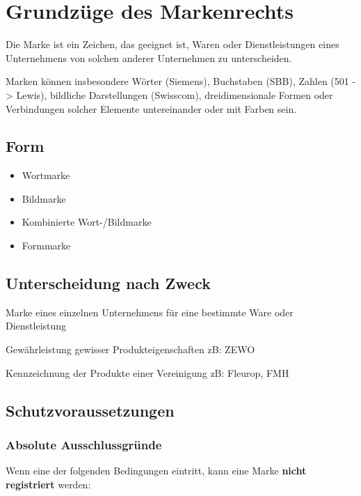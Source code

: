 \section{Grundzüge des Markenrechts}

Die Marke ist ein Zeichen, das geeignet ist, Waren oder Dienstleistungen
eines Unternehmens von solchen anderer Unternehmen zu unterscheiden.

Marken können insbesondere Wörter (Siemens), Buchstaben (SBB), Zahlen
(501 -> Lewis), bildliche Darstellungen (Swisscom),
dreidimensionale Formen oder Verbindungen solcher Elemente untereinander
oder mit Farben sein.

\subsection{Form}

\begin{itemize}
\tightlist
\item Wortmarke
\item Bildmarke
\item Kombinierte Wort-/Bildmarke
\item Formmarke
\end{itemize}

\subsection{Unterscheidung nach Zweck}

\begin{description}
	\tightlist
	\item[Individualmarke] Marke eines einzelnen Unternehmens für eine
	bestimmte Ware oder Dienstleistung
	\item[Garantiemarke]  Gewährleistung gewisser Produkteigenschaften
	zB: ZEWO
	\item[Kollektivmarke] Kennzeichnung der Produkte einer Vereinigung
	zB: Fleurop, FMH
\end{description}

\subsection{Schutzvoraussetzungen}

\subsubsection{Absolute Ausschlussgründe}

Wenn eine der folgenden Bedingungen eintritt, kann eine Marke
\textbf{nicht registriert} werden:


